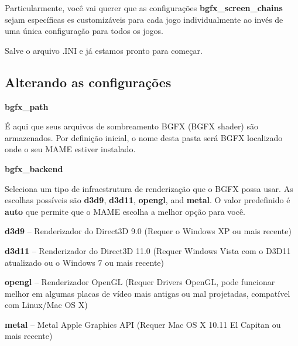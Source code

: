 \documentclass[letterpaper,10pt,brazil]{sphinxmanual}
\begin{document}
Particularmente, você vai querer que as configurações
\textbf{bgfx\_screen\_chains} sejam específicas es customizáveis para cada jogo
individualmente ao invés de uma única configuração para todos os jogos.

Salve o arquivo .INI e já estamos pronto para começar.


\subsection{Alterando as configurações}
\label{advanced/bgfx:alterando-as-configuracoes}
\begin{DUlineblock}{0em}
\item[] \textbf{bgfx\_path}
\item[] 
\item[]
\begin{DUlineblock}{\DUlineblockindent}
\item[] É aqui que seus arquivos de sombreamento BGFX (BGFX shader) são armazenados. Por definição inicial, o nome desta pasta será BGFX localizado onde o seu MAME estiver instalado.
\item[] 
\end{DUlineblock}
\item[] \textbf{bgfx\_backend}
\item[] 
\item[]
\begin{DUlineblock}{\DUlineblockindent}
\item[] Seleciona um tipo de infraestrutura de renderização que o BGFX possa usar. As escolhas possíveis são \textbf{d3d9}, \textbf{d3d11}, \textbf{opengl}, and \textbf{metal}. O valor predefinido é \textbf{auto} que permite que o MAME escolha a melhor opção para você.
\item[] 
\item[] \textbf{d3d9} -- Renderizador do Direct3D 9.0 (Requer o Windows XP ou mais recente)
\item[] \textbf{d3d11} -- Renderizador do Direct3D 11.0 (Requer Windows Vista com o D3D11 atualizado ou o  Windows 7 ou mais recente)
\item[] \textbf{opengl} -- Renderizador OpenGL (Requer Drivers OpenGL, pode funcionar melhor em algumas placas de vídeo mais antigas ou mal projetadas, compatível com Linux/Mac OS X)
\item[] \textbf{metal} -- Metal Apple Graphics API (Requer Mac OS X 10.11 El Capitan ou mais recente)
\item[] 
\end{DUlineblock}

\end{DUlineblock}
\end{document}
